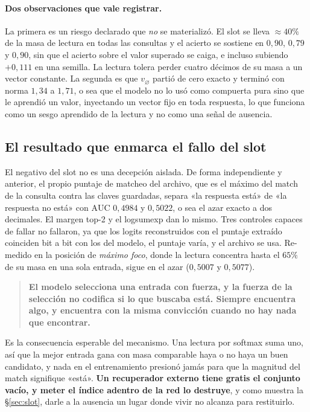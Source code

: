 \documentclass[11pt,a4paper]{article}
\begin{document}
\paragraph{Dos observaciones que vale registrar.} La primera es un riesgo declarado que \emph{no} se
materializó. El slot se lleva $\approx 40\%$ de la masa de lectura en todas las consultas y el
acierto se sostiene en $0{,}90$, $0{,}79$ y $0{,}90$, sin que el acierto sobre el valor superado se
caiga, e incluso subiendo $+0{,}111$ en una semilla. La lectura tolera perder cuatro décimos de su
masa a un vector constante. La segunda es que $v_{\varnothing}$ partió de cero exacto y terminó con
norma $1{,}34$ a $1{,}71$, o sea que el modelo no lo usó como compuerta pura sino que le aprendió un
valor, inyectando un vector fijo en toda respuesta, lo que funciona como un sesgo aprendido de la
lectura y no como una señal de ausencia.

\subsection{El resultado que enmarca el fallo del slot}

El negativo del slot no es una decepción aislada. De forma independiente y anterior, el propio
puntaje de matcheo del archivo, que es el máximo del match de la consulta contra las claves
guardadas, separa «la respuesta está» de «la respuesta no está» con $\mathrm{AUC}$ $0{,}4984$ y
$0{,}5022$, o sea el azar exacto a dos decimales. El margen top-2 y el logsumexp dan lo mismo. Tres
controles capaces de fallar no fallaron, ya que los logits reconstruidos con el puntaje extraído
coinciden bit a bit con los del modelo, el puntaje varía, y el archivo se usa. Re-medido en la
posición de \emph{máximo foco}, donde la lectura concentra hasta el $65\%$ de su masa en una sola
entrada, sigue en el azar ($0{,}5007$ y $0{,}5077$).

\begin{quote}
\textbf{El modelo selecciona una entrada con fuerza, y la fuerza de la selección no codifica si lo
que buscaba está. Siempre encuentra algo, y encuentra con la misma convicción cuando no hay nada que
encontrar.}
\end{quote}

Es la consecuencia esperable del mecanismo. Una lectura por softmax suma uno, así que la mejor
entrada gana con masa comparable haya o no haya un buen candidato, y nada en el entrenamiento
presionó jamás para que la magnitud del match signifique «está». \textbf{Un recuperador externo tiene
gratis el conjunto vacío, y meter el índice adentro de la red lo destruye}, y como muestra la
§\ref{sec:slot}, darle a la ausencia un lugar donde vivir no alcanza para restituirlo.
\end{document}
